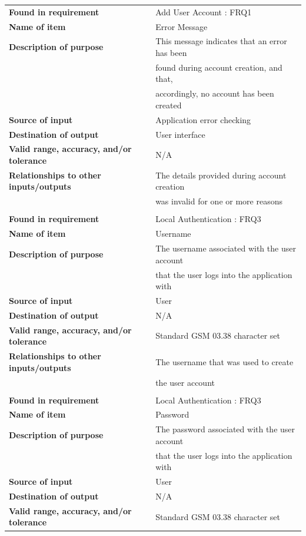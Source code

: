 \begin{tabular}{ll}
\textbf{Found in requirement}&Add User Account : FRQ1\\
\textbf{Name of item}&Error Message\\
\textbf{Description of purpose}&This message indicates that an error has been\\& found during account creation, and that,\\& accordingly, no account has been created\\
\textbf{Source of input}&Application error checking\\
\textbf{Destination of output}&User interface\\
\textbf{Valid range, accuracy, and/or tolerance}&N/A\\
\textbf{Relationships to other inputs/outputs}&The details provided during account creation\\& was invalid for one or more reasons\\
&\\
\textbf{Found in requirement}&Local Authentication : FRQ3\\
\textbf{Name of item}&Username\\
\textbf{Description of purpose}&The username associated with the user account\\& that the user logs into the application with\\
\textbf{Source of input}&User\\
\textbf{Destination of output}&N/A\\
\textbf{Valid range, accuracy, and/or tolerance}&Standard GSM 03.38 character set\\
\textbf{Relationships to other inputs/outputs}&The username that was used to create\\& the user account\\
&\\
\textbf{Found in requirement}&Local Authentication : FRQ3\\
\textbf{Name of item}&Password\\
\textbf{Description of purpose}&The password associated with the user account\\& that the user logs into the application with\\
\textbf{Source of input}&User\\
\textbf{Destination of output}&N/A\\
\textbf{Valid range, accuracy, and/or tolerance}&Standard GSM 03.38 character set\\

\end{tabular}
